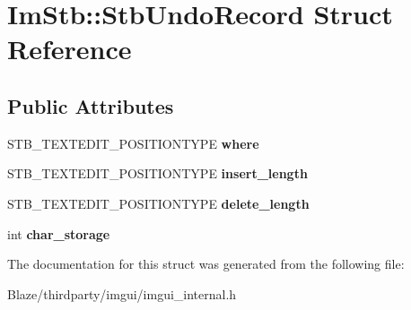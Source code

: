 \hypertarget{structImStb_1_1StbUndoRecord}{}\section{Im\+Stb\+:\+:Stb\+Undo\+Record Struct Reference}
\label{structImStb_1_1StbUndoRecord}
\subsection*{Public Attributes}
\begin{DoxyCompactItemize}
\item 
\mbox{\label{structImStb_1_1StbUndoRecord_af2d8dd183ed445623c4c71e2ff8b4970}} 
S\+T\+B\+\_\+\+T\+E\+X\+T\+E\+D\+I\+T\+\_\+\+P\+O\+S\+I\+T\+I\+O\+N\+T\+Y\+PE {\bfseries where}
\item 
\mbox{\label{structImStb_1_1StbUndoRecord_a05a5af46ce69bd4aeecb243fc1cba915}} 
S\+T\+B\+\_\+\+T\+E\+X\+T\+E\+D\+I\+T\+\_\+\+P\+O\+S\+I\+T\+I\+O\+N\+T\+Y\+PE {\bfseries insert\+\_\+length}
\item 
\mbox{\label{structImStb_1_1StbUndoRecord_a6b532830e366680607d3acd49f0aaf62}} 
S\+T\+B\+\_\+\+T\+E\+X\+T\+E\+D\+I\+T\+\_\+\+P\+O\+S\+I\+T\+I\+O\+N\+T\+Y\+PE {\bfseries delete\+\_\+length}
\item 
\mbox{\label{structImStb_1_1StbUndoRecord_a56d6d4fb37caf804700b294fb1fab9a1}} 
int {\bfseries char\+\_\+storage}
\end{DoxyCompactItemize}


The documentation for this struct was generated from the following file\+:\begin{DoxyCompactItemize}
\item 
Blaze/thirdparty/imgui/imgui\+\_\+internal.\+h\end{DoxyCompactItemize}
